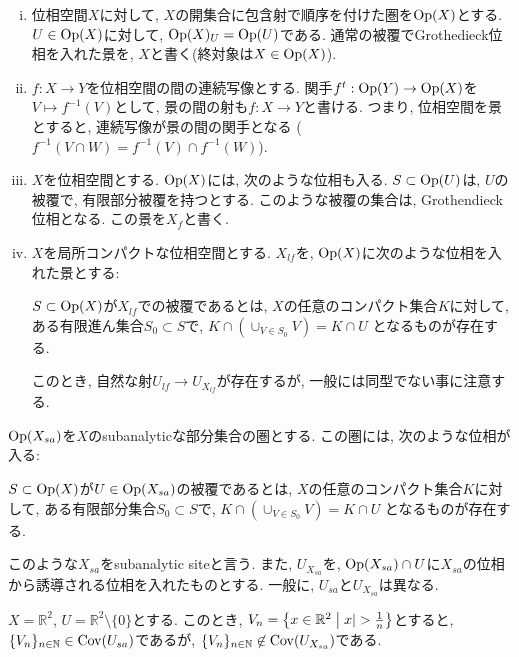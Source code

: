 \documentclass[../main]{subfiles}
\begin{document}
\begin{eg}
  \begin{enumerate}[(i)]
    \item 位相空間$X$に対して,
      $X$の開集合に包含射で順序を付けた圏を$\mathrm{Op}(X)$とする.
      $U\in\mathrm{Op}(X)$に対して, $\mathrm{Op}(X)_U = \mathrm{Op}(U)$である.
      通常の被覆でGrothedieck位相を入れた景を,
      $X$と書く(終対象は$X\in\mathrm{Op}(X)$).
    \item $f:X\to Y$を位相空間の間の連続写像とする.
      関手$f^t:\mathrm{Op}(Y)\to\mathrm{Op}(X)$を$V\mapsto f^{-1}(V)$として,
      景の間の射も$f:X\to Y$と書ける.
      つまり, 位相空間を景とすると,
      連続写像が景の間の関手となる
      ($f^{-1}(V\cap W)=f^{-1}(V)\cap f^{-1}(W)$).
    \item $X$を位相空間とする.
      $\mathrm{Op}(X)$には, 次のような位相も入る.
      $S\subset \mathrm{Op}(U)$は,
      $U$の被覆で, 有限部分被覆を持つとする.
      このような被覆の集合は, Grothendieck位相となる.
      この景を$X_f$と書く.
    \item $X$を局所コンパクトな位相空間とする.
      $X_{lf}$を, $\mathrm{Op}(X)$に次のような位相を入れた景とする:

      $S\subset\mathrm{Op}(X)$が$X_{lf}$での被覆であるとは,
      $X$の任意のコンパクト集合$K$に対して,
      ある有限進ん集合$S_0\subset S$で,
      $K\cap (\cup_{V\in S_0} V) = K\cap U$
      となるものが存在する.

      このとき, 自然な射$U_{lf}\to U_{X_{lf}}$が存在するが,
      一般には同型でない事に注意する.
  \end{enumerate}
\end{eg}

\begin{dfn}
  $\mathrm{Op}(X_{sa})$を$X$のsubanalyticな部分集合の圏とする.
  この圏には, 次のような位相が入る:

  $S\subset\mathrm{Op}(X)$が$U\in\mathrm{Op}(X_{sa})$の被覆であるとは,
  $X$の任意のコンパクト集合$K$に対して,
  ある有限部分集合$S_0\subset S$で,
  $K\cap (\cup_{V\in S_0} V) = K\cap U$
  となるものが存在する.

  このような$X_{sa}$をsubanalytic siteと言う.
  また, $U_{X_{sa}}$を,
  $\mathrm{Op}(X_{sa})\cap U$に$X_{sa}$の位相から誘導される位相を入れたものとする.
  一般に, $U_{sa}$と$U_{X_{sa}}$は異なる.
\end{dfn}

\begin{eg}
  $X = \mathbb{R}^2$, $U = \mathbb{R}^2\setminus\{0\}$とする.
  このとき, $V_n = \left\{ x\in\mathbb{R}^2 \relmiddle |x|>\frac{1}{n} \right\}$とすると,
  $\{V_n\}_{n\in\mathbb{N}}\in\mathrm{Cov}(U_{sa})$であるが,
  $\{V_n\}_{n\in\mathbb{N}}\not\in\mathrm{Cov}(U_{X_{sa}})$である.
\end{eg}
\end{document}
